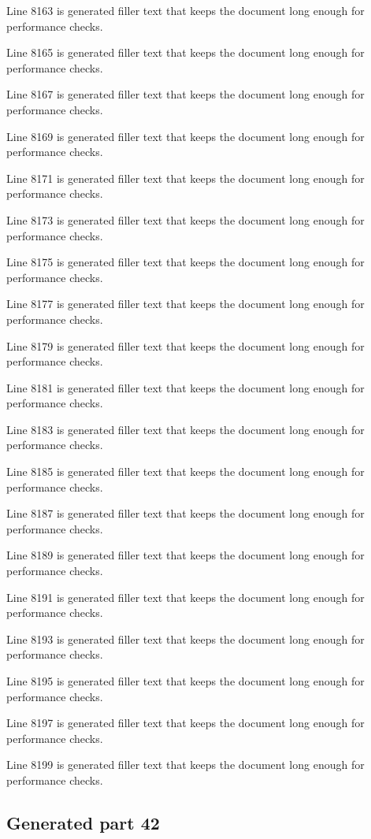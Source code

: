 Line 8163 is generated filler text that keeps the document long enough for performance checks.

Line 8165 is generated filler text that keeps the document long enough for performance checks.

Line 8167 is generated filler text that keeps the document long enough for performance checks.

Line 8169 is generated filler text that keeps the document long enough for performance checks.

Line 8171 is generated filler text that keeps the document long enough for performance checks.

Line 8173 is generated filler text that keeps the document long enough for performance checks.

Line 8175 is generated filler text that keeps the document long enough for performance checks.

Line 8177 is generated filler text that keeps the document long enough for performance checks.

Line 8179 is generated filler text that keeps the document long enough for performance checks.

Line 8181 is generated filler text that keeps the document long enough for performance checks.

Line 8183 is generated filler text that keeps the document long enough for performance checks.

Line 8185 is generated filler text that keeps the document long enough for performance checks.

Line 8187 is generated filler text that keeps the document long enough for performance checks.

Line 8189 is generated filler text that keeps the document long enough for performance checks.

Line 8191 is generated filler text that keeps the document long enough for performance checks.

Line 8193 is generated filler text that keeps the document long enough for performance checks.

Line 8195 is generated filler text that keeps the document long enough for performance checks.

Line 8197 is generated filler text that keeps the document long enough for performance checks.

Line 8199 is generated filler text that keeps the document long enough for performance checks.

\subsection{Generated part 42}

